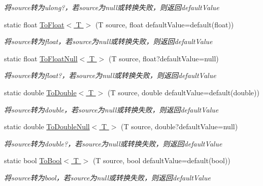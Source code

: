 \begin{DoxyCompactItemize}
\begin{DoxyCompactList}\small\item\em 将source转为ulong?，若source为null或转换失败，则返回default\+Value \end{DoxyCompactList}\item 
static float \hyperlink{class_x_c_l_net_tools_1_1_common_1_1_data_type_convert_a5b731d77475825f8076062700300fb1d}{To\+Float$<$ T $>$} (T source, float default\+Value=default(float))
\begin{DoxyCompactList}\small\item\em 将source转为float，若source为null或转换失败，则返回default\+Value \end{DoxyCompactList}\item 
static float \hyperlink{class_x_c_l_net_tools_1_1_common_1_1_data_type_convert_a9002d5c068ca8576f2319ae15c941506}{To\+Float\+Null$<$ T $>$} (T source, float?default\+Value=null)
\begin{DoxyCompactList}\small\item\em 将source转为float?，若source为null或转换失败，则返回default\+Value \end{DoxyCompactList}\item 
static double \hyperlink{class_x_c_l_net_tools_1_1_common_1_1_data_type_convert_a331227ffa8db1d71402b3154da934f9c}{To\+Double$<$ T $>$} (T source, double default\+Value=default(double))
\begin{DoxyCompactList}\small\item\em 将source转为double，若source为null或转换失败，则返回default\+Value \end{DoxyCompactList}\item 
static double \hyperlink{class_x_c_l_net_tools_1_1_common_1_1_data_type_convert_a41cb50328a52f09ca9a26a0077e9f819}{To\+Double\+Null$<$ T $>$} (T source, double?default\+Value=null)
\begin{DoxyCompactList}\small\item\em 将source转为double?，若source为null或转换失败，则返回default\+Value \end{DoxyCompactList}\item 
static bool \hyperlink{class_x_c_l_net_tools_1_1_common_1_1_data_type_convert_a4368d6697502ec519f8fc5c8c3a4cc03}{To\+Bool$<$ T $>$} (T source, bool default\+Value=default(bool))
\begin{DoxyCompactList}\small\item\em 将source转为bool，若source为null或转换失败，则返回default\+Value \end{DoxyCompactList}\item 

\end{DoxyCompactItemize}
